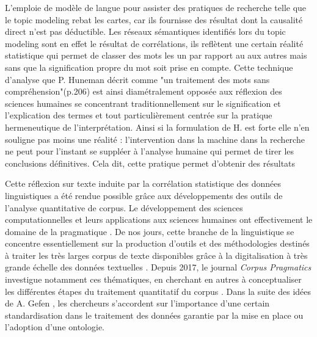 \documentclass[11pt,french]{article}
\begin{document}
L'emploie de modèle de langue pour assister des pratiques de recherche telle que le topic modeling rebat les cartes, car ils fournisse des résultat dont la causalité direct n'est pas déductible. Les réseaux sémantiques identifiés lors du topic modeling sont en effet le résultat de corrélations, ils reflètent une certain réalité statistique qui permet de classer des mots les un par rapport au aux autres mais sans que la signification propre du mot soit prise en compte. Cette technique d'analyse que P. Huneman décrit comme "un traitement des mots sans compréhension"(p.206) est ainsi diamétralement opposée aux réflexion des sciences humaines se concentrant traditionnellement sur le signification et l'explication des termes et tout particulièrement centrée sur la pratique hermeneutique de l'interprétation. Ainsi si la formulation de H. est forte elle n'en souligne pas moins une réalité : l'intervention dans la machine dans la recherche ne peut pour l'instant se suppléer à  l'analyse humaine qui permet de tirer les conclusions définitives.  Cela dit, cette pratique permet d'obtenir des résultats 

Cette réflexion sur texte induite par la corrélation statistique des données linguistiques a été rendue possible grâce aux développements des outils de l'analyse quantitative de corpus. Le développement des sciences computationnelles et leurs applications aux sciences humaines ont effectivement le domaine de la pragmatique \cite{bracopsIntroduction2010a}. De nos jours, cette branche de la linguistique se concentre essentiellement sur la production d'outils et des méthodologies destinés à traiter les très larges corpus de texte disponibles grâce à la digitalisation à très grande échelle des données textuelles \cite{landertCorpusPragmatics2023}. Depuis 2017, le journal \textit{Corpus Pragmatics} investigue notamment ces thématiques, en cherchant en autres à conceptualiser les différentes étapes du traitement quantitatif du corpus \cite[cf la pyramide de la recherche quantitative p.458-459]{jucker18IntroductionPart2018}. Dans la suite des idées de A. Gefen \cite[p.~65\footnote{"[...]toutes ces opérations relèvent d’une lourde ingénierie des connaissances. Elles présupposent des modélisations plus ou moins normatives. Les processus de sélection et de structuration des entités des textes impliquent donc des sémantiques – si ce n’est des ontologies –, qu’elles soient explicites et gérées par les outils des arbres ad
hoc, ou implicites et apportées par la tradition".}]{gefenEnjeuxEpistemologiquesHumanites2015}, les chercheurs s'accordent sur l'importance d'une certain standardisation dans le traitement des données garantie par la mise en place ou l'adoption d'une ontologie.
\end{document}
